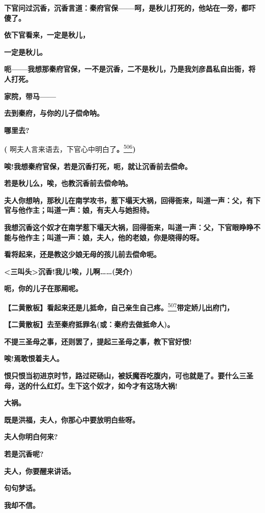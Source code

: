 \textbf{下官问过沉香，沉香言道：秦府官保------呵，是秋儿打死的，他站在一旁，都吓傻了。}

\textbf{依下官看来，一定是秋儿，}

\textbf{一定是秋儿。}

\textbf{呃------我想那秦府官保，一不是沉香，二不是秋儿，乃是我刘彦昌私自出衙，将人打死。}

\textbf{家院，带马------}

\textbf{去到秦府，与你的儿子偿命呐。}

\textbf{哪里去?}

\textbf{(}
啊夫人言来语去，下官心中明白了\textbf{。}\protect\hyperlink{fn506}{\textsuperscript{506}}\textbf{)}

\textbf{唉!我想秦府官保，若是沉香打死，呃，就让沉香前去偿命。}

\textbf{若是秋儿么，唉，也教沉香前去偿命呐。}

\textbf{夫人你想呐，那秋儿在南学攻书，惹下塌天大祸，回得衙来，叫道一声：父，有下官与他作主；叫道一声：娘，有夫人与她担待。}

\textbf{我想沉香这个奴才在南学惹下塌天大祸，回得衙来，叫道一声：父，下官眼睁睁不能与他作主；叫道一声：娘，夫人，他的老娘，你是晓得的呀。}

\textbf{看将起来，还是教这少娘无母的孩儿前去偿命呃。}

\textbf{\textless{}三叫头\textgreater{}沉香!我儿!唉，儿啊\ldots{}\ldots{}(哭介)}

\textbf{呃，你的儿子在那厢呢。}

\textbf{【二黄散板】看起来还是儿抵命，自己亲生自己疼。}\protect\hyperlink{fn507}{\textsuperscript{507}}\textbf{带定娇儿出府门，}

\textbf{【二黄散板】去至秦府抵罪名(或：秦府去做抵命人)。}

\textbf{不提三圣母之事，还则罢了，提起三圣母之事，教下官好恨!}

\textbf{唉!焉敢恨着夫人。}

\textbf{恨只恨当初进京时节，路过硭砀山，被妖魔吞吃腹内，可也就是了。要什么三圣母，送的什么红灯。生下这个奴才，如今才有这场大祸!}

\textbf{大祸。}

\textbf{既是洪福，夫人，你那心中要放明白些呀。}

\textbf{夫人你明白何来?}

\textbf{若是沉香呢?}

\textbf{夫人，你要醒来讲话。}

\textbf{句句梦话。}

\textbf{我却不信。}

